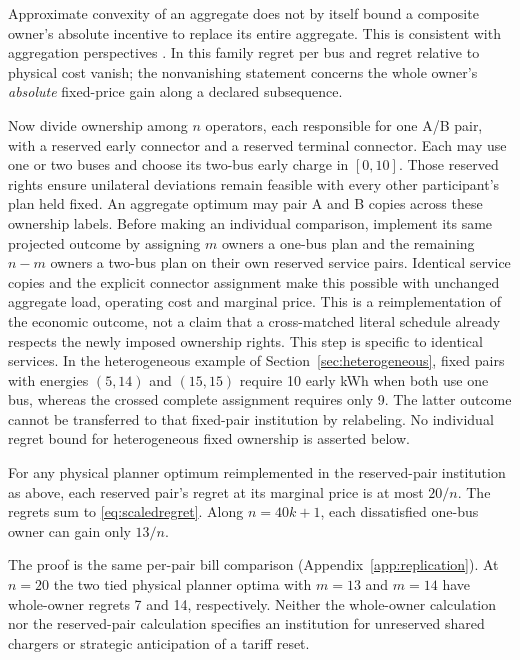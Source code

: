 Approximate convexity of an aggregate does not by itself bound a composite
owner's absolute incentive to replace its entire aggregate. This is consistent
with aggregation perspectives \citep{starr1969,hreinsson2021}. In this
family regret per bus and regret relative to physical cost vanish; the
nonvanishing statement concerns the whole owner's \emph{absolute} fixed-price
gain along a declared subsequence.

Now divide ownership among $n$ operators, each responsible for one A/B
pair, with a reserved early connector and a reserved terminal connector.
Each may use one or two buses and choose its two-bus early charge in
$[0,10]$. Those reserved rights ensure unilateral deviations remain feasible
with every other participant's plan held fixed.
An aggregate optimum may pair A and B copies across these ownership labels.
Before making an individual comparison, implement its same projected outcome
by assigning $m$ owners a one-bus plan and the remaining $n-m$ owners a
two-bus plan on their own reserved service pairs. Identical service copies
and the explicit connector assignment make this possible with unchanged
aggregate load, operating cost and marginal price. This is a reimplementation
of the economic outcome, not a claim that a cross-matched literal schedule
already respects the newly imposed ownership rights.
This step is specific to identical services. In the heterogeneous example
of Section~\ref{sec:heterogeneous}, fixed pairs with energies $(5,14)$
and $(15,15)$ require 10 early kWh when both use one bus, whereas the
crossed complete assignment requires only 9. The latter outcome cannot
be transferred to that fixed-pair institution by relabeling. No individual
regret bound for heterogeneous fixed ownership is asserted below.

\begin{corollary}\label{cor:individual}
For any physical planner optimum reimplemented in the reserved-pair
institution as above, each reserved pair's regret at its marginal price
is at most $20/n$. The regrets sum to
\eqref{eq:scaledregret}. Along $n=40k+1$, each dissatisfied one-bus owner
can gain only $13/n$.
\end{corollary}
The proof is the same per-pair bill comparison
(Appendix~\ref{app:replication}). At $n=20$ the two tied physical planner
optima with $m=13$ and $m=14$ have whole-owner regrets 7 and 14,
respectively. Neither the whole-owner calculation
nor the reserved-pair calculation specifies an institution for unreserved
shared chargers or strategic anticipation of a tariff reset.


